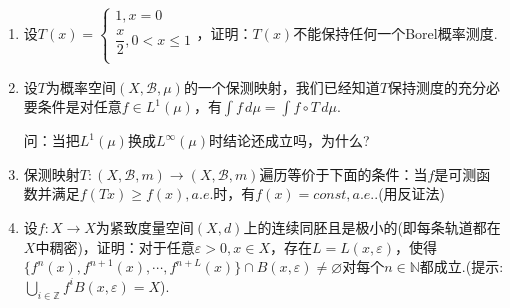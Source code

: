 \documentclass{ctexart}
\begin{document}
\begin{enumerate}
    \item 设$T(x)=\begin{cases}
        1,x=0 \\
        \dfrac{x}{2},0<x\leqslant 1\\
    \end{cases}$，证明：$T(x)$不能保持任何一个Borel概率测度.
    \item 设$T$为概率空间$(X,\mathcal{B},\mu)$的一个保测映射，我们已经知道$T$保持测度的充分必要条件是对任意$f\in L^1(\mu)$，有$\int{f}\,d\mu=\int{f\circ T}\,d\mu$.\par
    问：当把$L^1(\mu)$换成$L^\infty(\mu)$时结论还成立吗，为什么?
    \item 保测映射$T:(X,\mathcal{B},m)\to(X,\mathcal{B},m)$遍历等价于下面的条件：当$f$是可测函数并满足$f(Tx)\geqslant f(x),a.e.$时，有$f(x)=const,a.e.$.(用反证法)
    \item 设$f:X\to X$为紧致度量空间$(X,d)$上的连续同胚且是极小的(即每条轨道都在$X$中稠密)，证明：对于任意$\varepsilon>0,x\in X$，存在$L=L(x,\varepsilon)$，使得$\{f^n(x),f^{n+1}(x),\cdots,f^{n+L}(x)\}\cap B(x,\varepsilon)\neq\varnothing$对每个$n\in\mathbb{N}$都成立.(提示:$\bigcup_{i\in\mathbb{Z}}{f^i{B(x,\varepsilon)}}=X$).
\end{enumerate}
\end{document}
